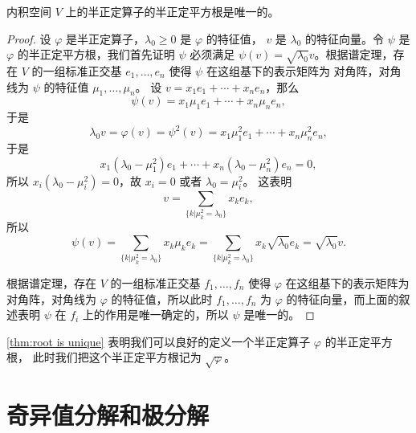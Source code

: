 \documentclass[fontset=none,zihao=-4]{Notes}
\begin{document}
\begin{theorem}\label{thm:root is unique}
  内积空间 $V$ 上的半正定算子的半正定平方根是唯一的。
\end{theorem}
\begin{proof}
  设 $\varphi$ 是半正定算子，$\lambda_0\geq 0$ 是 $\varphi$ 的特征值，
  $v$ 是 $\lambda_0$ 的特征向量。令 $\psi$ 是 $\varphi$ 的半正定平方根，我们首先证明
  $\psi$ 必须满足 $\psi(v)=\sqrt{\lambda_0}v$。根据谱定理，存在 $V$
  的一组标准正交基 $e_1,\dots,e_n$ 使得 $\psi$ 在这组基下的表示矩阵为
  对角阵，对角线为 $\psi$ 的特征值 $\mu_1,\dots,\mu_n$。
  设 $v=x_1e_1+\cdots+x_ne_n$，那么
  \[
    \psi(v)=x_1\mu_1e_1+\cdots+x_n\mu_ne_n,  
  \]
  于是
  \[
    \lambda_0 v=\varphi(v)=\psi^2(v)=x_1\mu_1^2e_1+\cdots+x_n\mu_n^2e_n,  
  \]
  于是
  \[
    x_1(\lambda_0-\mu_1^2)e_1+\cdots+x_n(\lambda_0-\mu_n^2)e_n=  0,
  \]
  所以 $x_i(\lambda_0-\mu_i^2)=0$，故 $x_i=0$ 或者 $\lambda_0=\mu_i^2$。
  这表明
  \[
    v=\sum_{\{k|\mu_k^2=\lambda_0\}} x_ke_k,
  \]
  所以 
  \[
    \psi(v)=\sum_{\{k|\mu_k^2=\lambda_0\}} x_k\mu_ke_k=
    \sum_{\{k|\mu_k^2=\lambda_0\}} x_k\sqrt{\lambda_0}e_k=\sqrt{\lambda_0}v.
  \]

  根据谱定理，存在 $V$
  的一组标准正交基 $f_1,\dots,f_n$ 使得 $\varphi$ 在这组基下的表示矩阵为
  对角阵，对角线为 $\varphi$ 的特征值，所以此时 $f_1,\dots,f_n$ 为 $\varphi$
  的特征向量，而上面的叙述表明 $\psi$ 在 $f_i$ 上的作用是唯一确定的，所以
  $\psi$ 是唯一的。
\end{proof}

\autoref{thm:root is unique} 表明我们可以良好的定义一个半正定算子 $\varphi$ 的半正定平方根，
此时我们把这个半正定平方根记为 $\sqrt{\varphi}$。



\section{奇异值分解和极分解}
\end{document}

